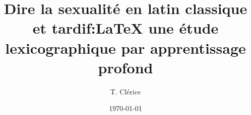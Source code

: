 \documentclass{book}
\title{Dire la sexualité en latin classique et tardif:\LaTeX{} une étude lexicographique par apprentissage profond}
\author{T. Clérice}
\date{\today}
\begin{document}
\maketitle

\dominitoc

\tableofcontents














\appendix




\end{document}
